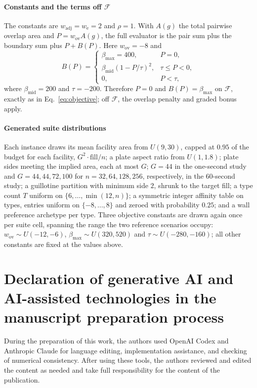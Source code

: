 \documentclass[preprint,12pt,authoryear,nonatbib]{elsarticle}
\newcommand{\cF}{\mathcal{F}}
\begin{document}
\paragraph{Constants and the terms off $\cF$}
The constants are $w_{\mathrm{adj}}=w_{\mathrm e}=2$ and $\rho=1$. With
$A(g)$ the total pairwise overlap area and $P=w_{\mathrm{ov}}A(g)$, the full
evaluator is the pair sum plus the boundary sum plus $P+B(P)$. Here
$w_{\mathrm{ov}}=-8$ and
\[
B(P)=\begin{cases}
\beta_{\max}=400, & P=0,\\
\beta_{\mathrm{mid}}(1-P/\tau)^2, & \tau\le P<0,\\
0, & P<\tau,
\end{cases}
\]
where $\beta_{\mathrm{mid}}=200$ and $\tau=-200$. Therefore $P=0$ and
$B(P)=\beta_{\max}$ on $\cF$, exactly as in Eq.~\eqref{eq:objective}; off
$\cF$, the overlap penalty and graded bonus apply.

\paragraph{Generated suite distributions}
Each instance draws its mean facility area from $U(9,30)$, capped at $0.95$ of
the budget for each facility, $G^2\cdot\mathrm{fill}/n$; a plate aspect ratio from
$U(1,1.8)$; plate sides meeting the implied area, each at most $G$;
$G=44$ in the one-second study and $G=44,44,72,100$ for
$n=32,64,128,256$, respectively, in the 60-second study; a
guillotine partition with minimum side $2$, shrunk to the target fill; a type
count $T$ uniform on $\{6,\dots,\min(12,n)\}$; a symmetric integer affinity
table on types, entries uniform on $\{-8,\dots,8\}$ and zeroed with
probability $0.25$; and a wall preference archetype per type. Three objective
constants are drawn again once per suite cell, spanning the range the two
reference scenarios occupy: $w_{\mathrm{ov}}\sim U(-12,-6)$,
$\beta_{\max}\sim U(320,520)$ and $\tau\sim U(-280,-160)$; all other constants
are fixed at the values above.

\section*{Declaration of generative AI and AI-assisted technologies in the
manuscript preparation process}
During the preparation of this work, the authors used OpenAI Codex and Anthropic
Claude for language editing, implementation assistance, and checking of
numerical consistency. After using these tools, the authors reviewed and edited
the content as needed and take full responsibility for the content of the
publication.

\printbibliography
\end{document}
